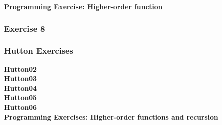 \textbf{Programming Exercise: Higher-order function}\\

\newpage

\subsubsection{Exercise 8}


\subsubsection{Hutton Exercises}
\textbf{Hutton02}\\

\textbf{Hutton03}\\

\textbf{Hutton04}\\

\textbf{Hutton05}\\

\textbf{Hutton06}\\


\textbf{Programming Exercises: Higher-order functions and recursion}\\


